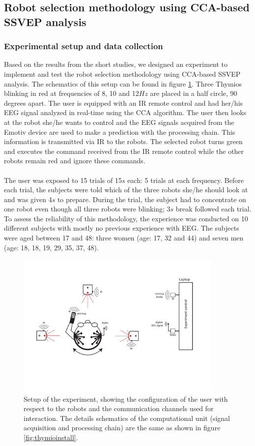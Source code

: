 \documentclass[smallextended]{svjour3}
\begin{document}
\subsection{Robot selection methodology using CCA-based SSVEP analysis}
\subsubsection{Experimental setup and data collection}
Based on the results from the short studies, we designed an experiment to implement and test the robot selection methodology using CCA-based SSVEP analysis. The schematics of this setup can be found in figure \ref{fig:experiment-set-up}.
Three Thymios blinking in red at frequencies of 8, 10 and 12$Hz$ are placed in a half circle, 90 degrees apart.
The user is equipped with an IR remote control and had her/his EEG signal analyzed in real-time using the CCA algorithm.
The user then looks at the robot she/he wants to control and the EEG signals acquired from the Emotiv device are used to make a prediction with the processing chain.
This information is transmitted via IR to the robots.
The selected robot turns green and executes the command received from the IR remote control while the other robots remain red and ignore these commands.\\
\\
The user was exposed to 15 trials of 15$s$ each: 5 trials at each frequency. Before each trial, the subjects were told which of the three robots she/he should look at and was given 4$s$ to prepare. During the trial, the subject had to concentrate on one robot even though all three robots were blinking; 3$s$ break followed each trial.
To assess the reliability of this methodology, the experience was conducted on 10 different subjects with mostly no previous experience with EEG.
The subjects were aged between 17 and 48: three women (age: 17, 32 and 44) and seven men (age: 18, 18, 19, 29, 35, 37, 48). 

\begin{figure}
\center
\includegraphics[width=0.9\textwidth]{figures/schema-global2.pdf}
    \caption{Setup of the experiment, showing the configuration of the user with respect to the robots and the communication channels used for interaction. The details schematics of the computational unit (signal acquisition and processing chain) are the same as shown in figure \ref{fig:thymioinstall}.} \label{fig:experiment-set-up}
\end{figure}
\end{document}
